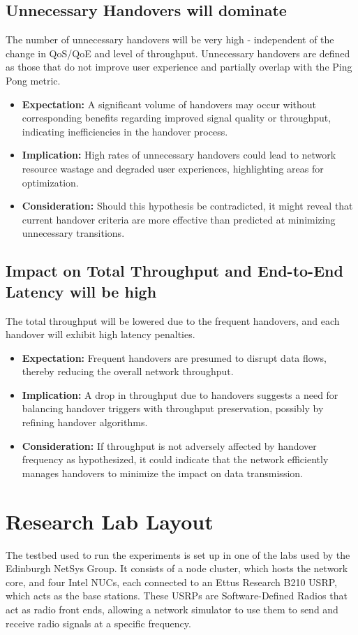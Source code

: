 \subsection{Unnecessary Handovers will dominate}
The number of unnecessary handovers will be very high - independent of the change in QoS/QoE and level of throughput. Unnecessary handovers are defined as those that do not improve user experience and partially overlap with the Ping Pong metric.
\begin{itemize}
    \item \textbf{Expectation:} A significant volume of handovers may occur without corresponding benefits regarding improved signal quality or throughput, indicating inefficiencies in the handover process.
    \item \textbf{Implication:} High rates of unnecessary handovers could lead to network resource wastage and degraded user experiences, highlighting areas for optimization.
    \item \textbf{Consideration:} Should this hypothesis be contradicted, it might reveal that current handover criteria are more effective than predicted at minimizing unnecessary transitions.
\end{itemize}

\subsection{Impact on Total Throughput and End-to-End Latency will be high}
The total throughput will be lowered due to the frequent handovers, and each handover will exhibit high latency penalties.
\begin{itemize}
    \item \textbf{Expectation:} Frequent handovers are presumed to disrupt data flows, thereby reducing the overall network throughput.
    \item \textbf{Implication:} A drop in throughput due to handovers suggests a need for balancing handover triggers with throughput preservation, possibly by refining handover algorithms.
    \item \textbf{Consideration:} If throughput is not adversely affected by handover frequency as hypothesized, it could indicate that the network efficiently manages handovers to minimize the impact on data transmission.
\end{itemize}


\section{Research Lab Layout} \label{sec:research-lab-layout}
The testbed used to run the experiments is set up in one of the labs used by the Edinburgh NetSys Group. It consists of a node cluster, which hosts the network core, and four Intel NUCs, each connected to an Ettus Research B210 USRP, which acts as the base stations. These USRPs are Software-Defined Radios that act as radio front ends, allowing a network simulator to use them to send and receive radio signals at a specific frequency.

